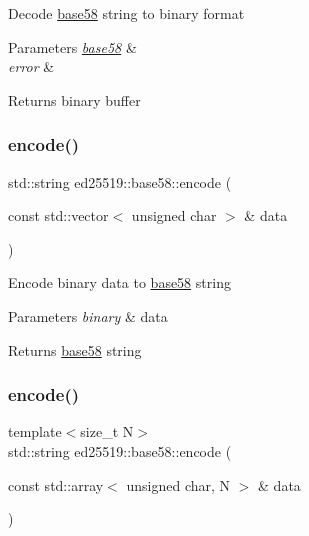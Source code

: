 Decode \mbox{\hyperlink{namespaceed25519_1_1base58}{base58}} string to binary format 
\begin{DoxyParams}{Parameters}
{\em \mbox{\hyperlink{namespaceed25519_1_1base58}{base58}}} & \\
\hline
{\em error} & \\
\hline
\end{DoxyParams}
\begin{DoxyReturn}{Returns}
binary buffer 
\end{DoxyReturn}
\mbox{\label{namespaceed25519_1_1base58_a857764be1561c5e59bab056d771f22a1}} 
\subsubsection{\texorpdfstring{encode()}{encode()}\hspace{0.1cm}{\footnotesize\ttfamily [1/2]}}
{\footnotesize\ttfamily std\+::string ed25519\+::base58\+::encode (\begin{DoxyParamCaption}\item[{const std\+::vector$<$ unsigned char $>$ \&}]{data }\end{DoxyParamCaption})}

Encode binary data to \mbox{\hyperlink{namespaceed25519_1_1base58}{base58}} string 
\begin{DoxyParams}{Parameters}
{\em binary} & data \\
\hline
\end{DoxyParams}
\begin{DoxyReturn}{Returns}
\mbox{\hyperlink{namespaceed25519_1_1base58}{base58}} string 
\end{DoxyReturn}
\mbox{\label{namespaceed25519_1_1base58_a9e1eded8fc634072114771f77046693a}} 
\subsubsection{\texorpdfstring{encode()}{encode()}\hspace{0.1cm}{\footnotesize\ttfamily [2/2]}}
{\footnotesize\ttfamily template$<$size\+\_\+t N$>$ \\
std\+::string ed25519\+::base58\+::encode (\begin{DoxyParamCaption}\item[{const std\+::array$<$ unsigned char, N $>$ \&}]{data }\end{DoxyParamCaption})}


